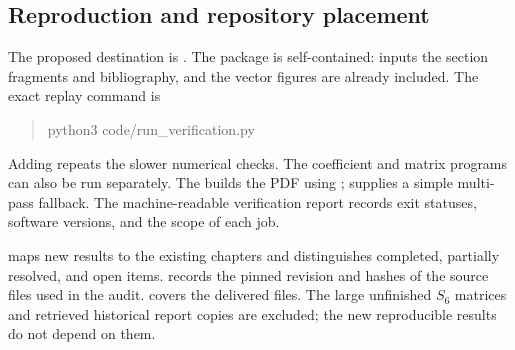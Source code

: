 \subsection{Reproduction and repository placement}
The proposed destination is
.
The package is self-contained:  inputs the
section fragments and bibliography, and the vector figures are already
included. The exact replay command is
\begin{quote}\ttfamily
python3 code/run\_verification.py
\end{quote}
Adding  repeats the slower numerical checks.
The coefficient and matrix programs can also be run separately.
The  builds the PDF using ;
 supplies a simple multi-pass fallback.
The machine-readable verification report records exit statuses,
software versions, and the scope of each job.

 maps new results to the existing
chapters and distinguishes completed, partially resolved, and open
items.  records the pinned
revision and hashes of the source files used in the audit.
 covers the delivered files. The large
unfinished $S_6$ matrices and retrieved historical report copies are
excluded; the new reproducible results do not depend on them.
